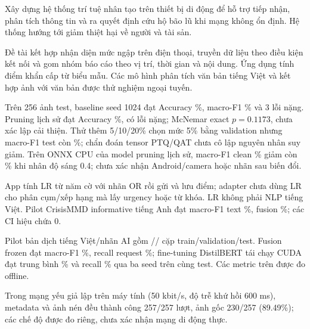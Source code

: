 
Xây dựng hệ thống trí tuệ nhân tạo trên thiết bị di động để hỗ trợ tiếp nhận, phân tích thông tin và ra quyết định cứu hộ bão lũ khi mạng không ổn định. Hệ thống hướng tới giảm thiệt hại về người và tài sản.

Đề tài kết hợp nhận diện mức ngập trên điện thoại, truyền dữ liệu theo điều kiện kết nối và gom nhóm báo cáo theo vị trí, thời gian và nội dung. Ứng dụng tính điểm khẩn cấp từ biểu mẫu. Các mô hình phân tích văn bản tiếng Việt và kết hợp ảnh với văn bản được thử nghiệm ngoại tuyến.

Trên 256 ảnh test, baseline seed 1024 đạt Accuracy \NewImageAccuracy\%, macro-F1 \NewImageMacroFOne\% và 3 lỗi nặng. Pruning lịch sử đạt Accuracy \PruningAccuracy\%, có \PruningCriticalCount{} lỗi nặng; McNemar exact $p=0.1173$, chưa xác lập cải thiện. Thử thêm 5/10/20\% chọn mức 5\% bằng validation nhưng macro-F1 test còn \LocalPrunedFOne\%; chẩn đoán tensor PTQ/QAT chưa cô lập nguyên nhân suy giảm. Trên ONNX CPU của model pruning lịch sử, macro-F1 clean \QualityCleanMacroFOne\% giảm còn \QualityDarkMacroFOne\% khi nhân độ sáng 0.4; chưa xác nhận Android/camera hoặc nhãn sau biến đổi.

App tính LR từ năm cờ với nhãn OR rồi gửi và lưu điểm; adapter chưa dùng LR cho phân cụm/xếp hạng mà lấy urgency hoặc từ khóa. LR không phải NLP tiếng Việt. Pilot CrisisMMD informative tiếng Anh đạt macro-F1 text \MMTextFOne\%, fusion \MMFusionFOne\%; các CI hiệu chứa 0.

Pilot bản dịch tiếng Việt/nhãn AI gồm \VISilverTrainN/\VISilverDevN/\VISilverTestN{} cặp train/validation/test. Fusion frozen đạt macro-F1 \VISilverFusionFOne\%, recall request \VISilverFusionRecall\%; fine-tuning DistilBERT tái chạy CUDA đạt trung bình \VISilverFineFOne\% và recall \VISilverFineRecall\% qua ba seed trên cùng test. Các metric trên được đo offline.

Trong mạng yếu giả lập trên máy tính (50 kbit/s, độ trễ khứ hồi 600 ms), metadata và ảnh nén đều thành công 257/257 lượt, ảnh gốc 230/257 (89.49\%); các chế độ được đo riêng, chưa xác nhận mạng di động thực.

